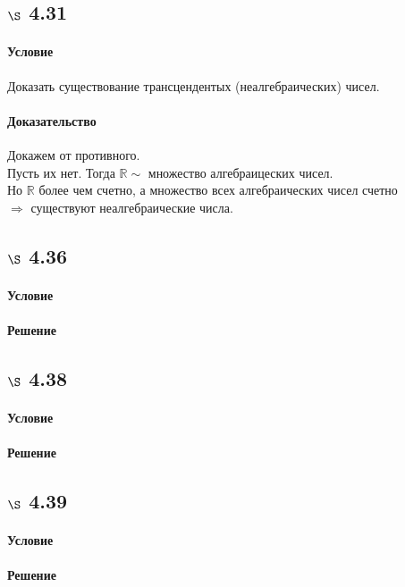\documentclass[a4paper,12pt]{article}
\begin{document}
\subsection*{$\S$ 4.31}
\paragraph*{Условие}
Доказать существование трансцендентых (неалгебраических) чисел.
\paragraph*{Доказательство}
Докажем от противного.\\
Пусть их нет. Тогда $ \mathbb{R} \sim $ множество алгебраицеских чисел.\\
Но $ \mathbb{R} $ более чем счетно, а множество всех алгебраических чисел счетно\\
$\Rightarrow$ существуют неалгебраические числа.

\subsection*{$\S$ 4.36}
\paragraph*{Условие}
\paragraph*{Решение}

\subsection*{$\S$ 4.38}
\paragraph*{Условие}
\paragraph*{Решение}

\subsection*{$\S$ 4.39}
\paragraph*{Условие}
\paragraph*{Решение}
\end{document}

